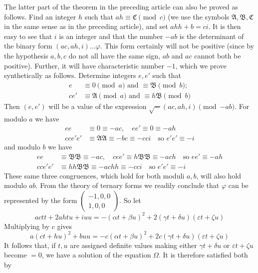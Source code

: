 The latter part of the theorem in the preceding article can also
be proved as follows. Find an integer \(h\) such that \(ah\equiv\mathfrak C\pmod c\)
(we use the symbols \(\mathfrak A,\mathfrak B,\mathfrak C\) in the same sense as in the preceding
article), and set \(ahh+b=ci\). It is then easy to see that \(i\)
is an integer and that the number \(-ab\) is the determinant of
the binary form \((ac,ah,i)\ldots\varphi\). This form certainly will not be positive
(since by the hypothesis \(a,b,c\) do not all have the same sign,
\(ab\) and \(ac\) cannot both be positive). Further, it will
have characteristic number \(-1\), which we prove synthetically
as follows. Determine integers \(e,e'\) such that
\[
\begin{aligned}
e&\equiv0\pmod a\text{ and }\equiv\mathfrak B\pmod b;\\
ce'&\equiv\mathfrak A\pmod a\text{ and }\equiv h\mathfrak B\pmod b
\end{aligned}
\]
Then \((e,e')\) will be a value of the expression \(\surd-(ac,ah,i)\pmod{-ab}\). For modulo
\(a\) we have
\[
\begin{aligned}
ee&\equiv0\equiv-ac,\quad ee'\equiv0\equiv-ah\\
cce'e'&\equiv\mathfrak A\mathfrak A\equiv-bc\equiv-cci\quad\text{so }e'e'\equiv-i
\end{aligned}
\]
and modulo \(b\) we have
\[
\begin{aligned}
ee&\equiv\mathfrak B\mathfrak B\equiv-ac,\quad cee'\equiv h\mathfrak B\mathfrak B\equiv-ach\quad\text{so }ee'\equiv-ah\\
cce'e'&\equiv hh\mathfrak B\mathfrak B\equiv-achh\equiv-cci\quad\text{so }e'e'\equiv-i
\end{aligned}
\]
These same three congruences, which hold for both moduli \(a,b\),
will also hold modulo \(ab\). From the theory of ternary forms
we readily conclude that \(\varphi\) can be represented by the form
\(\left(\begin{smallmatrix}-1,0,0\\1,0,0\end{smallmatrix}\right)\). So let
\[
actt+2ahtu+iuu=-(\alpha t+\beta u)^2+2(\gamma t+\delta u)(\varepsilon t+\zeta u)
\]
Multiplying by \(c\) gives
\[
a(ct+hu)^2+buu=-c(\alpha t+\beta u)^2+2c(\gamma t+\delta u)(\varepsilon t+\zeta u)
\]
It follows that, if \(t,u\) are assigned definite values making
either \(\gamma t+\delta u\) or \(\varepsilon t+\zeta u\) become \(=0\), we have a solution
of the equation \(\Omega\). It is therefore satisfied both by
